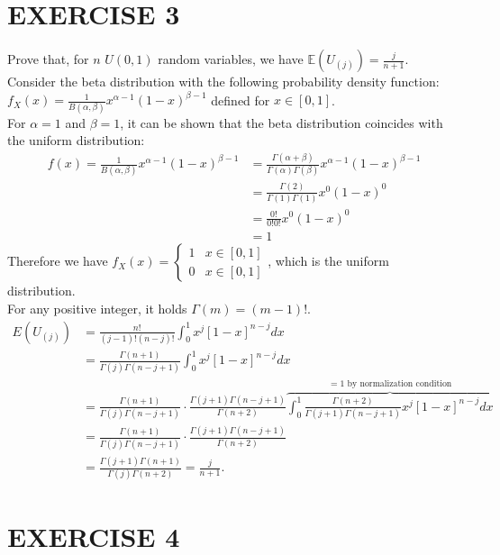 \documentclass[a4paper, 12pt]{article}
\begin{document}
\clearpage

\section*{EXERCISE 3}
\setlength\parindent{0pt}
Prove that, for $n$ $U(0,1)$ random variables, we have $ \mathbb{E} \left( U_{(j)} \right) = \frac{j}{n+1}$.\\
\bigbreak
Consider the beta distribution with the following probability density function:\\[5pt]
$f_X(x) =\frac{1}{B(\alpha, \beta)} x^{\alpha -1} (1-x)^{\beta-1} $ defined for $x\in [0,1]$.\\[5pt]
For $ \alpha=1$ and $\beta=1$, it can be shown that the beta distribution coincides with the uniform distribution:
\begin{align*}
	f(x) =\frac{1}{B(\alpha, \beta)} x^{\alpha -1} (1-x)^{\beta-1} & = \frac{\Gamma(\alpha + \beta)}{\Gamma(\alpha) \Gamma(\beta)} x^{\alpha -1} (1-x)^{\beta-1}\\[5pt]
	& = \frac{\Gamma(2)}{\Gamma(1) \Gamma(1)} x^{0} (1-x)^{0}\\[5pt]
	& = \frac{0!}{0!0!} x^{0} (1-x)^{0}\\[5pt]
	& = 1
\end{align*}
Therefore we have $f_X (x) =
\begin{cases}
	1 & x\in [0,1]\\[5pt]
	0 & x\in [0,1]
\end{cases}$, which is the uniform distribution.\\[5pt]
For any positive integer, it holds $\Gamma(m) = (m-1)!$.
\begin{align*}
E(U_{(j)}) &=\frac{n!}{(j-1)!(n-j)!}\int_0^1 x^{j}[1-x]^{n-j}dx \\[5pt]
&= \frac{ \Gamma(n+1)}{\Gamma(j) \Gamma(n-j+1)}\int_0^1 x^{j}[1-x]^{n-j}dx \\
&=\frac{ \Gamma(n+1)}{\Gamma(j) \Gamma(n-j+1)} \cdot \frac{\Gamma(j+1) \Gamma(n-j+1) }{ \Gamma(n+2)} \overbrace{\int_0^1 \frac{ \Gamma(n+2)}{\Gamma(j+1) \Gamma(n-j+1) } x^{j}[1-x]^{n-j}dx}^{=1 \text{ by normalization condition}}\\[5pt]
&= \frac{ \Gamma(n+1)}{\Gamma(j) \Gamma(n-j+1)} \cdot \frac{\Gamma(j+1) \Gamma(n-j+1) }{ \Gamma(n+2)} \\[5pt]
&= \frac{\Gamma(j+1) \Gamma(n+1)}{\Gamma(j) \Gamma(n+2)} = \frac{j}{n+1}.
\end{align*}

\section{EXERCISE 4}
\end{document}
